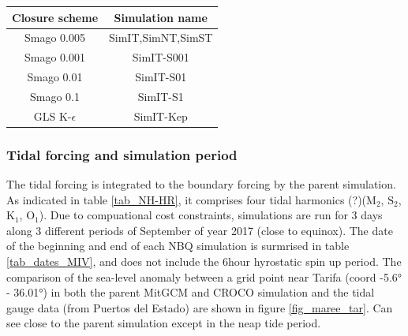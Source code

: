 \begin{table}[!h]
        \centering
        \begin{tabular}{|c|c|}
                \hline
                Closure scheme & Simulation name\\
                \hline
                Smago 0.005 & SimIT,SimNT,SimST\\
                Smago 0.001 & SimIT-S001\\
                Smago 0.01 & SimIT-S01\\
                Smago 0.1 & SimIT-S1\\
                GLS K-$\epsilon$ & SimIT-Kep\\
                \hline
        \end{tabular}
        \label{tab_sim3Dnames}
\end{table}


\subsubsection{Tidal forcing and simulation period}
The tidal forcing is integrated to the boundary forcing by the parent simulation. As indicated in table \ref{tab_NH-HR},  it comprises four tidal harmonics (?)($\text{M}_{\text{2}}$, $\text{S}_{\text{2}}$, $\text{K}_{\text{1}}$, $\text{O}_{\text{1}}$). Due to compuational cost constraints, simulations are run for 3 days along 3 different periods of September of year 2017 (close to equinox). The date of the beginning and end of each NBQ simulation is surmrised in table \ref{tab_dates_MIV}, and does not include the 6hour hyrostatic spin up period. The comparison of the sea-level anomaly between a grid point near Tarifa (coord -5.6° - 36.01°) in both the parent MitGCM and CROCO simulation and the tidal gauge data (from Puertos del Estado) are shown in figure \ref{fig_maree_tar}. Can see close to the parent simulation except in the neap tide period.

